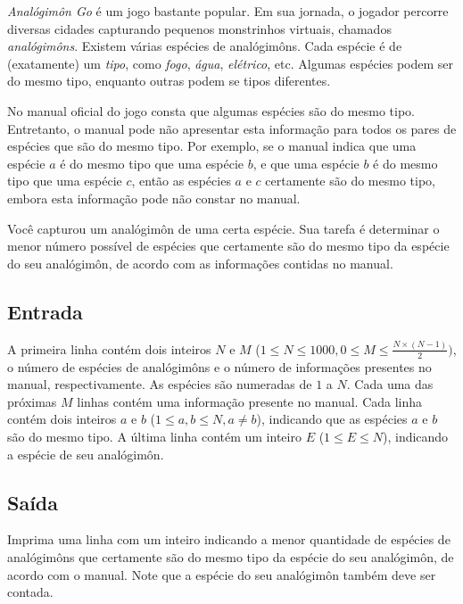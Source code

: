 \textit{Analógimôn Go} é um jogo bastante popular. Em sua jornada, o jogador percorre diversas
cidades capturando pequenos monstrinhos virtuais, chamados \textit{analógimôns}.
Existem várias espécies de analógimôns. Cada espécie é de
(exatamente) um \textit{tipo}, como \textit{fogo}, \textit{água}, \textit{elétrico}, etc.
Algumas espécies podem ser do mesmo tipo, enquanto outras podem se tipos
diferentes.

No manual oficial do jogo consta que algumas espécies são do
mesmo tipo. Entretanto, o manual pode não apresentar esta informação para todos
os pares de espécies que são do mesmo tipo. Por exemplo, se o manual indica
que uma espécie $a$ é do mesmo tipo que uma espécie $b$, e que uma espécie $b$ é
do mesmo tipo que uma espécie $c$, então as espécies $a$ e $c$ certamente são do mesmo
tipo, embora esta informação pode não constar no manual.

Você capturou um analógimôn de uma certa espécie. Sua tarefa é determinar o
menor número possível de espécies que certamente são do mesmo tipo da espécie
do seu analógimôn, de acordo com as informações contidas no manual.

\subsection*{Entrada}

A primeira linha contém dois inteiros $N$ e $M$ ($1 \leq N \leq 1000, 0 \leq M
\leq \frac{N \times (N-1)}{2})$, o número de espécies de analógimôns e o
número de informações presentes no manual, respectivamente. As espécies são
numeradas de $1$ a $N$.
Cada uma das próximas $M$ linhas contém uma informação presente no manual. Cada
linha contém dois inteiros $a$ e $b$ ($1 \leq a, b \leq N, a \neq b$), indicando
que as espécies $a$ e $b$ são do mesmo tipo.
A última linha contém um inteiro $E$ ($1 \leq E \leq N$), indicando a espécie de
seu analógimôn.

\subsection*{Saída}

Imprima uma linha com um inteiro indicando a menor quantidade de espécies de
analógimôns que certamente são do mesmo tipo da espécie do seu analógimôn, de
acordo com o manual. Note que a espécie do seu analógimôn também deve
ser contada.


